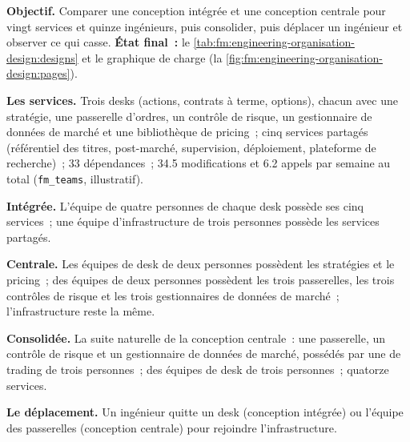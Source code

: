 \begin{tutorial}
\textbf{Objectif.} Comparer une conception intégrée et une conception centrale pour vingt services et quinze ingénieurs, puis consolider, puis déplacer un ingénieur et
observer ce qui casse. \textbf{État final~:} le \cref{tab:fm:engineering-organisation-design:designs} et le graphique de charge
(la \cref{fig:fm:engineering-organisation-design:pages}).
\begin{tutsteps}
\item \textbf{Les services.} Trois desks (actions, contrats à terme, options), chacun avec une stratégie, une passerelle d'ordres, un contrôle de risque, un gestionnaire de données de marché et
une bibliothèque de pricing~; cinq services partagés (référentiel des titres, post-marché, supervision, déploiement, plateforme de recherche)~; 33 dépendances~; 34.5 modifications et
6.2 appels par semaine au total (\texttt{fm\_teams}, illustratif).
\item \textbf{Intégrée.} L'équipe de quatre personnes de chaque desk possède ses cinq services~; une équipe d'infrastructure de trois personnes possède les services partagés.
\item \textbf{Centrale.} Les équipes de desk de deux personnes possèdent les stratégies et le pricing~; des équipes de deux personnes possèdent les trois passerelles, les trois contrôles de risque et les trois
gestionnaires de données de marché~; l'infrastructure reste la même.
\item \textbf{Consolidée.} La suite naturelle de la conception centrale~: une passerelle, un contrôle de risque et un gestionnaire de données de marché, possédés par une  de trading de
trois personnes~; des équipes de desk de trois personnes~; quatorze services.
\item \textbf{Le déplacement.} Un ingénieur quitte un desk (conception intégrée) ou l'équipe des passerelles (conception centrale) pour rejoindre l'infrastructure.
\end{tutsteps}
\end{tutorial}

